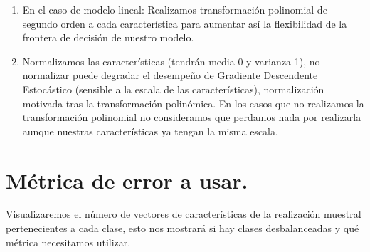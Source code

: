 \documentclass[11pt,a4paper]{article}
\theoremstyle{definition}
\begin{document}
\begin{enumerate}
		\item En el caso de modelo lineal: Realizamos transformación polinomial de segundo orden a cada característica para aumentar así la flexibilidad de la frontera de decisión de nuestro modelo.
		\item Normalizamos las características (tendrán media 0 y varianza 1), no normalizar puede degradar el desempeño de Gradiente Descendente Estocástico (sensible a la escala de las características), normalización motivada tras la transformación polinómica. En los casos que no realizamos la transformación polinomial no consideramos que perdamos nada por realizarla aunque nuestras características ya tengan la misma escala. %
	\end{enumerate}
	\section{Métrica de error a usar.}
	Visualizaremos el número de vectores de características de la realización muestral pertenecientes a cada clase, esto nos mostrará si hay clases desbalanceadas y qué métrica necesitamos utilizar.
	
\end{document}
